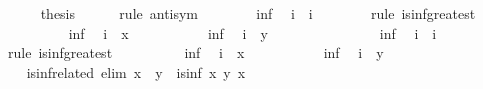 \begin{isabellebody}
\ \ \ \ \isamarkupfalse%
\ {\isacharquery}thesis\isanewline
\ \ \ \ \isamarkupfalse%
\ {\isacharparenleft}rule\ anti{\isacharunderscore}sym{\isacharparenright}\isanewline
\ \ \ \ \ \ \isamarkupfalse%
\ inf{\isacharprime}\ \isamarkupfalse%
\ {\isachardoublequoteopen}i\ {\isasymsqsubseteq}\ i{\isacharprime}{\isachardoublequoteclose}\isanewline
\ \ \ \ \ \ \isamarkupfalse%
\ {\isacharparenleft}rule\ is{\isacharunderscore}inf{\isacharunderscore}greatest{\isacharparenright}\isanewline
\ \ \ \ \ \ \ \ \isamarkupfalse%
\ inf\ \isamarkupfalse%
\ {\isachardoublequoteopen}i\ {\isasymsqsubseteq}\ x{\isachardoublequoteclose}\ \isacommand{{\isachardot}{\isachardot}}\isamarkupfalse%
\isanewline
\ \ \ \ \ \ \ \ \isamarkupfalse%
\ inf\ \isamarkupfalse%
\ {\isachardoublequoteopen}i\ {\isasymsqsubseteq}\ y{\isachardoublequoteclose}\ \isacommand{{\isachardot}{\isachardot}}\isamarkupfalse%
\isanewline
\ \ \ \ \ \ \isamarkupfalse%
\isanewline
\ \ \ \ \ \ \isamarkupfalse%
\ inf\ \isamarkupfalse%
\ {\isachardoublequoteopen}i{\isacharprime}\ {\isasymsqsubseteq}\ i{\isachardoublequoteclose}\isanewline
\ \ \ \ \ \ \isamarkupfalse%
\ {\isacharparenleft}rule\ is{\isacharunderscore}inf{\isacharunderscore}greatest{\isacharparenright}\isanewline
\ \ \ \ \ \ \ \ \isamarkupfalse%
\ inf{\isacharprime}\ \isamarkupfalse%
\ {\isachardoublequoteopen}i{\isacharprime}\ {\isasymsqsubseteq}\ x{\isachardoublequoteclose}\ \isacommand{{\isachardot}{\isachardot}}\isamarkupfalse%
\isanewline
\ \ \ \ \ \ \ \ \isamarkupfalse%
\ inf{\isacharprime}\ \isamarkupfalse%
\ {\isachardoublequoteopen}i{\isacharprime}\ {\isasymsqsubseteq}\ y{\isachardoublequoteclose}\ \isacommand{{\isachardot}{\isachardot}}\isamarkupfalse%
\isanewline
\ \ \ \ \ \ \isamarkupfalse%
\isanewline
\ \ \ \ \isamarkupfalse%
\isanewline
\ \ \isamarkupfalse%
%
\endisatagproof
{\isafoldproof}%
%
\isadelimproof
\isanewline
%
\endisadelimproof
%
\isadeliminvisible
\isanewline
\ \ %
\endisadeliminvisible
%
\isataginvisible
{}\isamarkupfalse%
\ is{\isacharunderscore}inf{\isacharunderscore}related\ {\isacharbrackleft}elim{\isacharquery}{\isacharbrackright}{\isacharcolon}\ {\isachardoublequoteopen}x\ {\isasymsqsubseteq}\ y\ {\isasymLongrightarrow}\ is{\isacharunderscore}inf\ x\ y\ x{\isachardoublequoteclose}\isanewline

\end{isabellebody}
